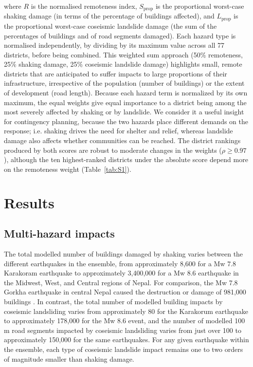 \documentclass[preprint,12pt,authoryear]{elsarticle}
\begin{document}
where $R$ is the normalised remoteness index, $S_{\text{prop}}$ is the proportional worst-case shaking damage (in terms of the percentage of buildings affected), and $L_{\text{prop}}$ is the proportional worst-case coseismic landslide damage (the sum of the percentages of buildings and of road segments damaged). Each hazard type is normalised independently, by dividing by its maximum value across all 77 districts, before being combined. This weighted sum approach (50\% remoteness, 25\% shaking damage, 25\% coseismic landslide damage) highlights small, remote districts that are anticipated to suffer impacts to large proportions of their infrastructure, irrespective of the population (number of buildings) or the extent of development (road length). Because each hazard term is normalized by its own maximum, the equal weights give equal importance to a district being among the most severely affected by shaking or by landslide. We consider it a useful insight for contingency planning, because the two hazards place different demands on the response; i.e. shaking drives the need for shelter and relief, whereas landslide damage also affects whether communities can be reached. The district rankings produced by both scores are robust to moderate changes in the weights ($\rho \geq 0.97$), although the ten highest-ranked districts under the absolute score depend more on the remoteness weight (Table~\ref{tab:S1}).

\section{Results}

\subsection{Multi-hazard impacts}

The total modelled number of buildings damaged by shaking varies between the different earthquakes in the ensemble, from approximately 8,600 for a Mw 7.8 Karakoram earthquake to approximately 3,400,000 for a Mw 8.6 earthquake in the Midwest, West, and Central regions of Nepal. For comparison, the Mw 7.8 Gorkha earthquake in central Nepal caused the destruction or damage of 981,000 buildings \citep{NationalPlanningCommission2015}. In contrast, the total number of modelled building impacts by coseismic landsliding varies from approximately 80 for the Karakorum earthquake to approximately 178,000 for the Mw 8.6 event, and the number of modelled 100 m road segments impacted by coseismic landsliding varies from just over 100 to approximately 150,000 for the same earthquakes. For any given earthquake within the ensemble, each type of coseismic landslide impact remains one to two orders of magnitude smaller than shaking damage.
\end{document}
